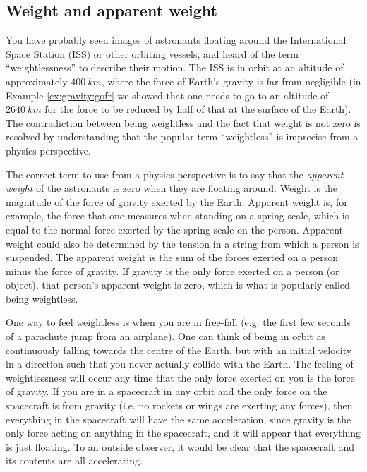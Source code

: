 \subsection{Weight and apparent weight}
You have probably seen images of astronauts floating around the International Space Station (ISS) or other orbiting vessels, and heard of the term ``weightlessness''  to describe their motion. The ISS is in orbit at an altitude of approximately $\SI{400}{km}$, where the force of Earth's gravity is far from negligible (in Example \ref{ex:gravity:gofr} we showed that one needs to go to an altitude of $\SI{2640}{km}$ for the force to be reduced by half of that at the surface of the Earth). The contradiction between being weightless and the fact that weight is not zero is resolved by understanding that the popular term ``weightless'' is imprecise from a physics perspective.

The correct term to use from a physics perspective is to say that the \textit{apparent weight} of the astronauts is zero when they are floating around. Weight is the magnitude of the force of gravity exerted by the Earth. Apparent weight is, for example, the force that one measures when standing on a spring scale, which is equal to the normal force exerted by the spring scale on the person. Apparent weight could also be determined by the tension in a string from which a person is suspended. The apparent weight is the sum of the forces exerted on a person minus the force of gravity. If gravity is the only force exerted on a person (or object), that person's apparent weight is zero, which is what is popularly called being weightless.

One way to feel weightless is when you are in free-fall (e.g. the first few seconds of a parachute jump from an airplane). One can think of being in orbit as continuously falling towards the centre of the Earth, but with an initial velocity in a direction such that you never actually collide with the Earth. The feeling of weightlessness will occur any time that the only force exerted on you is the force of gravity. If you are in a spacecraft in any orbit and the only force on the spacecraft is from gravity (i.e. no rockets or wings are exerting any forces), then everything in the spacecraft will have the same acceleration, since gravity is the only force acting on anything in the spacecraft, and it will appear that everything is just floating. To an outside observer, it would be clear that the spacecraft and its contents are all accelerating.

